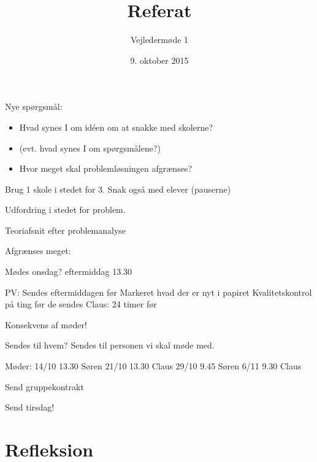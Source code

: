 \documentclass[hidelinks, 12pt]{article}
\begin{document}
	
	\title{Referat}
	\author{Vejledermøde 1}
	\date{9. oktober 2015}
	\maketitle
	
	Nye spørgsmål:
	\begin{itemize}
		\item Hvad synes I om id\'een om at snakke med skolerne?
		\item (evt. hvad synes I om spørgsmålene?)
		\item Hvor meget skal problemløsningen afgrænses?
	\end{itemize}
	
	Brug 1 skole i stedet for 3. Snak også med elever (pauserne)
	
	Udfordring i stedet for problem.
	
	Teoriafsnit efter problemanalyse
	
	Afgrænses meget:

	Mødes onsdag? eftermiddag 13.30
	
	PV:
		Sendes eftermiddagen før
		Markeret hvad der er nyt i papiret
		Kvalitetskontrol på ting før de sendes
	Claus:
		24 timer før

	Konsekvens af møder!
	
	Sendes til hvem? Sendes til personen vi skal møde med.

	Møder:
	14/10 13.30 Søren
	21/10 13.30 Claus
	29/10 9.45  Søren
	6/11  9.30  Claus

	Send gruppekontrakt

	Send tirsdag!

	\section{Refleksion}
\end{document}
